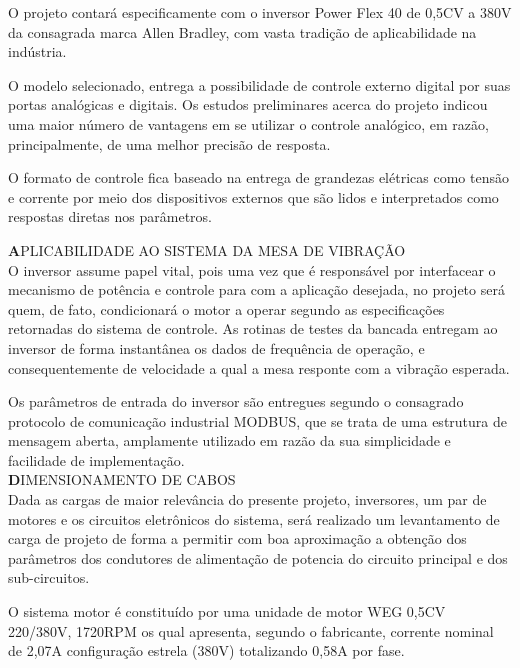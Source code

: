        
        O projeto contará especificamente com o inversor Power Flex 40 de 0,5CV a 380V da consagrada marca Allen Bradley, com vasta tradição de aplicabilidade na indústria. 
        
        
        O modelo selecionado, entrega a possibilidade de controle externo digital por suas portas analógicas e digitais. Os estudos preliminares acerca do projeto indicou uma maior número de vantagens em se utilizar o controle analógico, em razão, principalmente, de uma melhor precisão de resposta.
        
        O formato de controle fica baseado na entrega de grandezas elétricas como tensão e corrente por meio dos dispositivos externos que são lidos e interpretados como respostas diretas nos parâmetros.
        
        
\textbf APLICABILIDADE AO SISTEMA DA MESA DE VIBRAÇÃO\\

O inversor assume papel vital, pois uma vez que é responsável por interfacear o mecanismo de potência e controle para com a aplicação desejada, no projeto será quem, de fato, condicionará o motor a operar segundo as especificações retornadas do sistema de controle. As rotinas de testes da bancada entregam ao inversor de forma instantânea os dados de frequência de operação, e consequentemente de velocidade a qual a mesa responte com a vibração esperada. 

Os parâmetros de entrada do inversor são entregues segundo o consagrado protocolo de comunicação industrial MODBUS, que se trata de uma estrutura de mensagem aberta, amplamente utilizado em razão da sua simplicidade e facilidade de implementação.\\

\textbf DIMENSIONAMENTO DE CABOS\\

Dada as cargas de maior relevância do presente projeto, inversores, um par de motores e os circuitos eletrônicos do sistema, será realizado um levantamento de carga de projeto de forma a permitir com boa aproximação a obtenção dos parâmetros dos condutores de alimentação de potencia do circuito principal e dos sub-circuitos.

    O sistema motor é constituído por uma unidade de motor WEG 0,5CV 220/380V, 1720RPM os qual apresenta, segundo o fabricante, corrente nominal de 2,07A configuração estrela (380V) totalizando 0,58A por fase.
    
